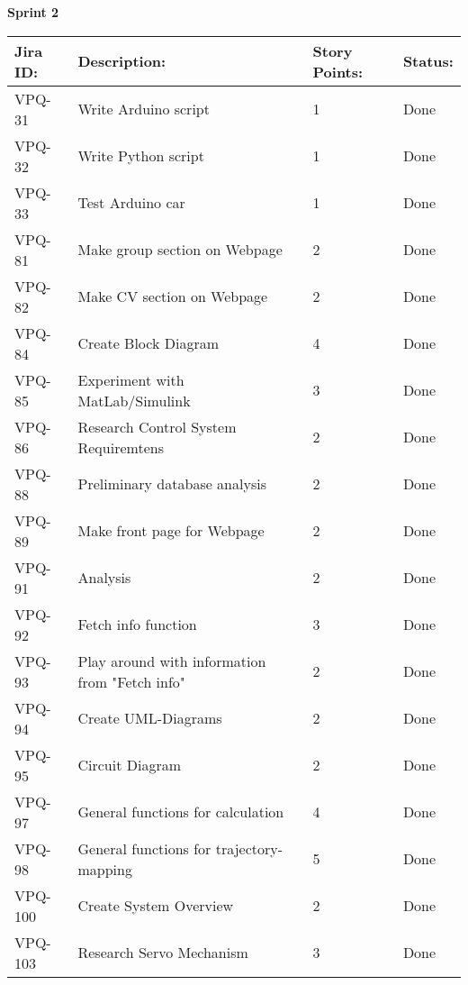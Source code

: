 \begin{table}[ht]
\centering\textbf{Sprint 2}
\begin{tabularx}{\linewidth}{|m{1.5cm} m{8.3cm} m{1.5cm} m{3.5cm}|}
\hline
    \rowcolor{cadetgrey} 
     \textbf{Jira ID:} & \textbf{Description:}  & \textbf{Story Points:} & \textbf{Status: } \\ \hline
     VPQ-31 & Write Arduino script & 1 \centering & Done  \\ 
\rowcolor{gainsboro} VPQ-32 & Write Python script  & 1\centering & Done  \\
      VPQ-33 & Test Arduino car  & 1\centering & Done  \\
\rowcolor{gainsboro} VPQ-81 & Make group section on Webpage & 2\centering & Done  \\
      VPQ-82 & Make CV section on Webpage & 2\centering & Done  \\
\rowcolor{gainsboro} VPQ-84 & Create Block Diagram & 4\centering & Done  \\
      VPQ-85 & Experiment with MatLab/Simulink & 3\centering & Done  \\
\rowcolor{gainsboro} VPQ-86 & Research Control System Requiremtens & 2\centering & Done  \\    
      VPQ-88 & Preliminary database analysis & 2\centering & Done  \\
\rowcolor{gainsboro}  VPQ-89 & Make front page for Webpage & 2\centering & Done   \\
      VPQ-91 & Analysis & 2\centering & Done  \\
\rowcolor{gainsboro} VPQ-92 & Fetch info function & 3\centering & Done  \\    
      VPQ-93 & Play around with information from "Fetch info" & 2\centering & Done  \\
\rowcolor{gainsboro}  VPQ-94 & Create UML-Diagrams & 2\centering & Done  \\
      VPQ-95 & Circuit Diagram & 2\centering & Done  \\
\rowcolor{gainsboro} VPQ-97 & General functions for calculation & 4\centering & Done  \\    
      VPQ-98 & General functions for trajectory-mapping & 5\centering & Done  \\
\rowcolor{gainsboro}  VPQ-100 & Create System Overview & 2\centering & Done  \\
      VPQ-103 & Research Servo Mechanism & 3\centering & Done  \\

\end{tabularx}
\end{table}
